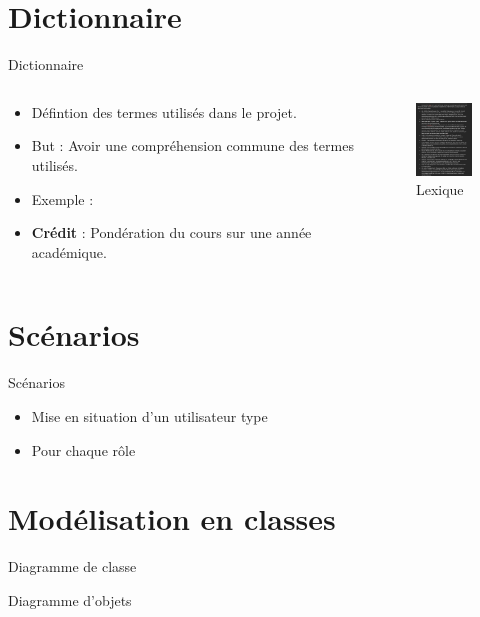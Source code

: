\documentclass[numbering=fraction]{beamer}
\begin{document}
\section{Dictionnaire}
\begin{frame}{Dictionnaire}
    \begin{columns}
        \begin{column}{0.75\textwidth}
            \begin{itemize}
                \item Défintion des termes utilisés dans le projet.
                \item But : Avoir une compréhension commune des termes utilisés.
                \item Exemple :
                \item \textbf{Crédit} : Pondération du cours sur une année académique.
            \end{itemize}
        \end{column}
        \begin{column}{0.25\textwidth}
            \begin{figure}
                \centering
                \includegraphics[width=2cm]{1.png}
                \caption{Lexique}
            \end{figure}

        \end{column}
    \end{columns}
\end{frame}

\section{Scénarios}

\begin{frame}{Scénarios}
    \begin{itemize}
        \item Mise en situation d'un utilisateur type
        \item Pour chaque rôle
    \end{itemize}
\end{frame}

\section{Modélisation en classes}

\begin{frame}{Diagramme de classe}
\end{frame}

\begin{frame}{Diagramme d'objets}
    
\end{frame}
\end{document}
